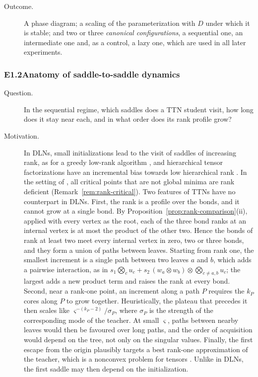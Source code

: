 \documentclass[11pt]{article}
\theoremstyle{definition}
\numberwithin{equation}{section}
\begin{document}
\begin{description}
\item[Outcome.] A phase diagram; a scaling of the parameterization with $D$ under which it is stable; and two or three \emph{canonical configurations}, a sequential one, an intermediate one and, as a control, a lazy one, which are used in all later experiments.
\end{description}

\subsubsection*{E1.2\quad Anatomy of saddle-to-saddle dynamics}
\begin{description}
\item[Question.] In the sequential regime, which saddles does a TTN student visit, how long does it stay near each, and in what order does its rank profile grow?
\item[Motivation.] In DLNs, small initializations lead to the visit of saddles of increasing rank, as for a greedy low-rank algorithm \citep{saxe2014exact,jacot2021saddle}, and hierarchical tensor factorizations have an incremental bias towards low hierarchical rank \citep{razin2022implicit}. In the setting of \citet[Theorem~5.2]{furman2026benign}, all critical points that are not global minima are rank deficient (Remark~\ref{rem:rank-critical}). Two features of TTNs have no counterpart in DLNs.
First, the rank is a profile over the bonds, and it cannot grow at a single bond. By Proposition~\ref{prop:rank-comparison}(ii), applied with every vertex as the root, each of the three bond ranks at an internal vertex is at most the product of the other two. Hence the bonds of rank at least two meet every internal vertex in zero, two or three bonds, and they form a union of paths between leaves. Starting from rank one, the smallest increment is a single path between two leaves $a$ and $b$, which adds a pairwise interaction, as in $s_1\bigotimes_cu_c+s_2\,(w_a\otimes w_b)\otimes\bigotimes_{c\ne a,b}u_c$; the largest adds a new product term and raises the rank at every bond.
Second, near a rank-one point, an increment along a path $P$ requires the $k_P$ cores along $P$ to grow together. Heuristically, the plateau that precedes it then scales like $\varsigma^{-(k_P-2)}/\sigma_P$, where $\sigma_P$ is the strength of the corresponding mode of the teacher. At small $\varsigma$, paths between nearby leaves would then be favoured over long paths, and the order of acquisition would depend on the tree, not only on the singular values.
Finally, the first escape from the origin plausibly targets a best rank-one approximation of the teacher, which is a nonconvex problem for tensors \citep{hillar2013most}. Unlike in DLNs, the first saddle may then depend on the initialization.

\end{description}
\end{document}
